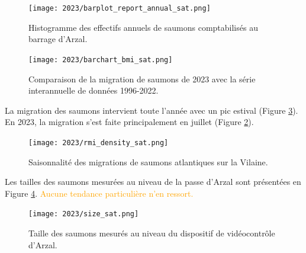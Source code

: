 \documentclass[11pt,twocolumn,titlepage,twoside]{article}\usepackage[]{graphicx}\usepackage[]{color}
\newcommand{\rev}[2][orange]{\textcolor{#1}{#2}}
\begin{document}
\begin{figure}[htpb]
\centering
\texttt{[image: 2023/barplot\_report\_annual\_sat.png]} 
\caption{Histogramme des effectifs annuels de saumons comptabilisés
au barrage d'Arzal.}
\label{barplot_report_annual_sat}
\end{figure}

\begin{figure}[htpb]
\centering
\texttt{[image: 2023/barchart\_bmi\_sat.png]} 
\caption{Comparaison de la migration de saumons de 2023 avec la
série interannuelle de données 1996-2022.}
\label{barchart_bmi_sat}
\end{figure}



La migration des saumons intervient toute l'année avec un pic estival (Figure
\ref{rmi_density_sat}). En 2023, la migration s'est faite principalement
en juillet (Figure \ref{barchart_bmi_sat}).

\begin{figure}[htpb]
\centering
\texttt{[image: 2023/rmi\_density\_sat.png]} 
\caption{Saisonnalité des migrations de saumons atlantiques sur la Vilaine.}
\label{rmi_density_sat}
\end{figure}


Les tailles des saumons mesurées au niveau de la passe d'Arzal sont présentées
en Figure \ref{size_sat}. \rev{Aucune tendance particulière n'en ressort.}

\begin{figure}[htpb]
\centering
\texttt{[image: 2023/size\_sat.png]} 
\caption{Taille des saumons mesurés au niveau du dispositif de vidéocontrôle
d'Arzal.}
\label{size_sat}
\end{figure}





















\clearpage
\end{document}
